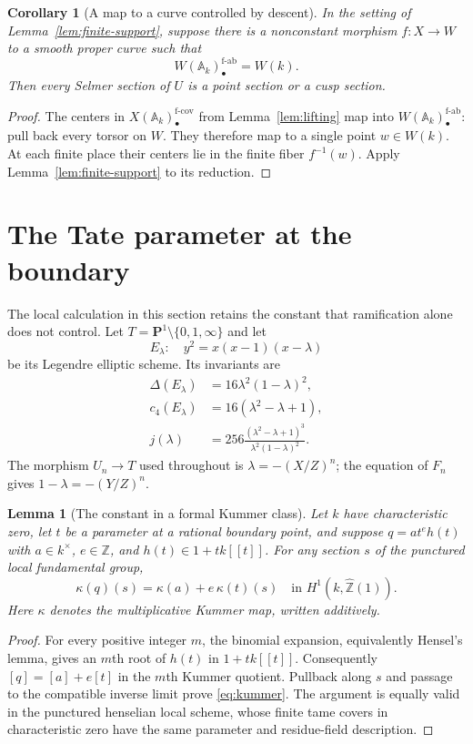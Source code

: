 \documentclass[11pt,a4paper]{article}
\newcommand{\Z}{\mathbb Z}
\newcommand{\A}{\mathbb A}
\newcommand{\Zhat}{\widehat{\Z}}
\newcommand{\fcov}{\mathrm{f\text{-}cov}}
\newcommand{\fab}{\mathrm{f\text{-}ab}}
\theoremstyle{plain}
\newtheorem{lemma}[theorem]{Lemma}
\newtheorem{corollary}[theorem]{Corollary}
\theoremstyle{definition}
\begin{document}
\begin{corollary}[A map to a curve controlled by descent]\label{cor:descent-map}
In the setting of Lemma~\ref{lem:finite-support}, suppose there is a
nonconstant morphism $f:X\to W$ to a smooth proper curve such that
\[
 W(\A_k)_\bullet^{\fab}=W(k).
\]
Then every Selmer section of $U$ is a point section or a cusp section.
\end{corollary}
\begin{proof}
The centers in $X(\A_k)_\bullet^{\fcov}$ from
Lemma~\ref{lem:lifting} map into $W(\A_k)_\bullet^{\fab}$: pull back
every torsor on $W$. They therefore map to a single point $w\in W(k)$.
At each finite place their centers lie in the finite fiber $f^{-1}(w)$.
Apply Lemma~\ref{lem:finite-support} to its reduction.
\end{proof}

\section{The Tate parameter at the boundary}\label{sec:cusp}

The local calculation in this section retains the constant that ramification
alone does not control. Let
$T=\mathbf P^1\setminus\{0,1,\infty\}$ and let
\[
 E_\lambda:\quad y^2=x(x-1)(x-\lambda)
\]
be its Legendre elliptic scheme. Its invariants are
\begin{equation}\label{eq:legendre}
 \begin{split}
 \Delta(E_\lambda)&=16\lambda^2(1-\lambda)^2,\\
 c_4(E_\lambda)&=16(\lambda^2-\lambda+1),\\
 j(\lambda)&=256\frac{(\lambda^2-\lambda+1)^3}
                         {\lambda^2(1-\lambda)^2}.
 \end{split}
\end{equation}
The morphism $U_n\to T$ used throughout is
$\lambda=-(X/Z)^n$; the equation of $F_n$ gives
$1-\lambda=-(Y/Z)^n$.

\begin{lemma}[The constant in a formal Kummer class]\label{lem:kummer}
Let $k$ have characteristic zero, let $t$ be a parameter at a rational
boundary point, and suppose $q=a t^e h(t)$ with $a\in k^\times$,
$e\in\Z$, and $h(t)\in1+t k[[t]]$. For any section $s$ of the
punctured local fundamental group,
\begin{equation}\label{eq:kummer}
 \kappa(q)(s)=\kappa(a)+e\,\kappa(t)(s)
       \quad\text{in }H^1(k,\Zhat(1)).
\end{equation}
Here $\kappa$ denotes the multiplicative Kummer map, written additively.
\end{lemma}
\begin{proof}
For every positive integer $m$, the binomial expansion, equivalently
Hensel's lemma, gives an $m$th root of $h(t)$ in $1+t k[[t]]$.
Consequently $[q]=[a]+e[t]$ in the $m$th Kummer quotient.
Pullback along $s$ and passage to the compatible inverse limit prove
\eqref{eq:kummer}. The argument is equally valid in the punctured
henselian local scheme, whose finite tame covers in characteristic
zero have the same parameter and residue-field description.
\end{proof}
\end{document}
